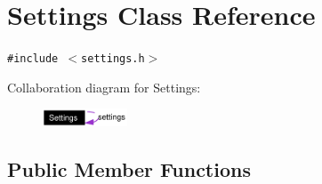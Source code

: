 \hypertarget{classSettings}{
\section{Settings Class Reference}
\label{classSettings}
}
{\tt \#include $<$settings.h$>$}

Collaboration diagram for Settings:\begin{figure}[H]
\begin{center}
\leavevmode
\includegraphics[width=71pt]{classSettings__coll__graph}
\end{center}
\end{figure}
\subsection*{Public Member Functions}
